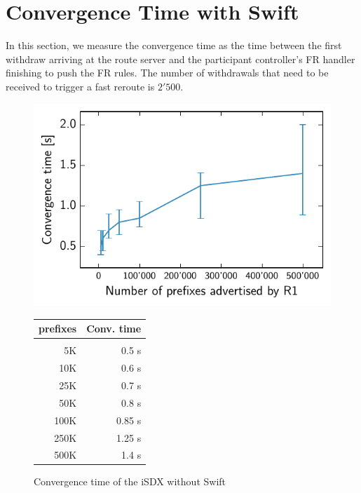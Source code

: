 \section{\label{chapter5:Convergence time with Swift}Convergence Time with Swift}

In this section, we measure the convergence time as the time between the first withdraw arriving at the route server and the participant controller's FR handler finishing to push the FR rules. The number of withdrawals that need to be received to trigger a fast reroute is $2'500$.

\begin{figure}[h]
\centering
\begin{minipage}[t]{.4\textwidth}
\centering
\vspace{0pt}
\includegraphics[scale = 1]{Figures/swift.pdf}
\end{minipage}\hfill
\begin{minipage}[t]{.4\textwidth}
\centering
\vspace{0pt}
\begin{tabular}{@{}rr@{}}
	\\
	prefixes & Conv. time \\
	\hline
	\\
    5K & 0.5 s  \\
    10K & 0.6 s   \\
    25K & 0.7 s   \\
    50K & 0.8 s  \\
    100K & 0.85 s \\
    250K & 1.25 s   \\
    500K & 1.4 s  \\
\end{tabular}
\end{minipage}
\caption{Convergence time of the iSDX without Swift}
\label{fig:withswift}
\end{figure}

